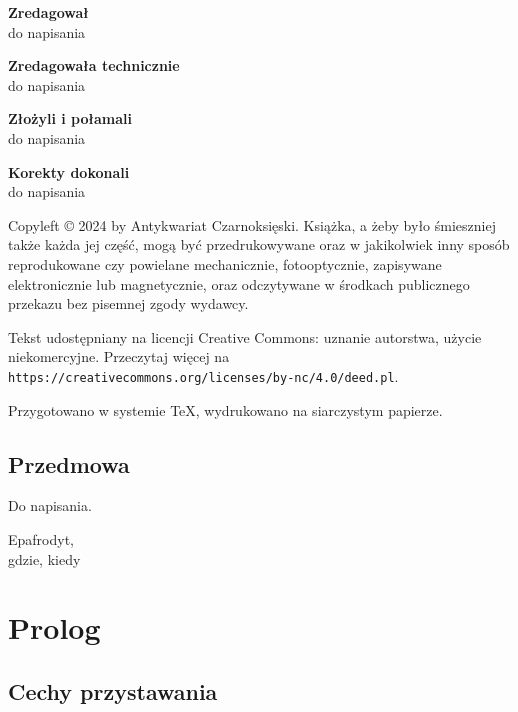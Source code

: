 \documentclass{parchment}
\begin{document}
{\noindent \textbf{Zredagował}\\do napisania} \vspace{5mm}

{\noindent \textbf{Zredagowała technicznie}\\do napisania} \vspace{5mm}

{\noindent \textbf{Złożyli i połamali}\\do napisania} \vspace{5mm}

{\noindent \textbf{Korekty dokonali}\\do napisania} \vfill

{\noindent Copyleft © 2024 by Antykwariat Czarnoksięski.
Książka, a żeby było śmieszniej także każda jej część, mogą być przedrukowywane oraz w jakikolwiek inny sposób reprodukowane czy powielane mechanicznie, fotooptycznie, zapisywane elektronicznie lub magnetycznie, oraz odczytywane w środkach publicznego przekazu bez pisemnej zgody wydawcy.
}

\vspace{5mm}
{
    \noindent
    Tekst udostępniany na licencji Creative Commons: uznanie autorstwa, użycie niekomercyjne. Przeczytaj więcej na \texttt{https://creativecommons.org/licenses/by-nc/4.0/deed.pl}.
}

\vspace{5mm}

{\noindent Przygotowano w systemie \TeX, wydrukowano na siarczystym papierze.}

\newpage
\section*{Przedmowa}
Do napisania.

\begin{flushright}
Epafrodyt,\\gdzie, kiedy
\end{flushright}

\tableofcontents
\cleardoublepage %

\chapter{Prolog}

\section{Cechy przystawania}
\end{document}
